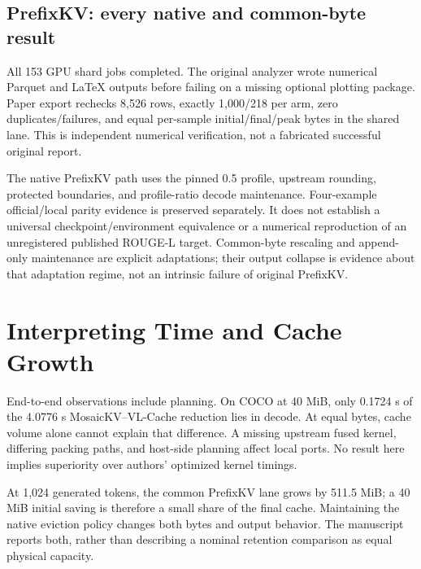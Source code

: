 \subsection{PrefixKV: every native and common-byte result}
\begin{table}[t]
\caption{PrefixKV campaign: 1,000 descriptions and 218 paper-style MM-Vet
questions, 8,526 rows, no failed or duplicate rows. Native is BF16 at nominal
ratio 0.5 with method-specific maintenance. The separate 40 MiB lane is FP16
with append-only compressed decoding. Its FullKV reference is distinct.}
\centering\scriptsize\resizebox{\textwidth}{!}{}
\end{table}
All 153 GPU shard jobs completed. The original analyzer wrote numerical
Parquet and LaTeX outputs before failing on a missing optional plotting
package. Paper export rechecks 8,526 rows, exactly 1,000/218 per arm,
zero duplicates/failures, and equal per-sample initial/final/peak bytes in
the shared lane. This is independent numerical verification, not a fabricated
successful original report.

The native PrefixKV path uses the pinned 0.5 profile, upstream rounding,
protected boundaries, and profile-ratio decode maintenance. Four-example
official/local parity evidence is preserved separately. It does not establish
a universal checkpoint/environment equivalence or a numerical reproduction of
an unregistered published ROUGE-L target. Common-byte rescaling and append-only
maintenance are explicit adaptations; their output collapse is evidence about
that adaptation regime, not an intrinsic failure of original PrefixKV.

\section{Interpreting Time and Cache Growth}
End-to-end observations include planning. On COCO at 40 MiB, only 0.1724 s
of the 4.0776 s MosaicKV--VL-Cache reduction lies in decode. At equal bytes,
cache volume alone cannot explain that difference. A missing upstream fused
kernel, differing packing paths, and host-side planning affect local ports.
No result here implies superiority over authors' optimized kernel timings.

At 1,024 generated tokens, the common PrefixKV lane grows by 511.5 MiB;
a 40 MiB initial saving is therefore a small share of the final cache.
Maintaining the native eviction policy changes both bytes and output behavior.
The manuscript reports both, rather than describing a nominal retention
comparison as equal physical capacity.

